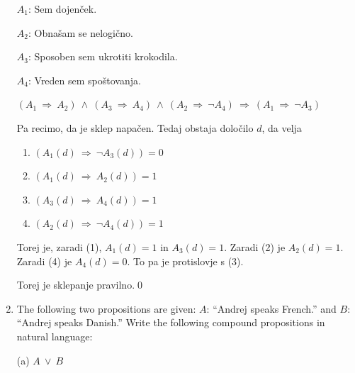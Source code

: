 \documentclass[11pt,paper=b5,footinclude,headinclude]{scrbook} %
\def\ali {{~\vee~}}
\def\inn {{~\wedge~}}
\def\sledi {{~\Rightarrow~}}
\begin{document}
\begin{enumerate}
$A_1$: Sem dojenček.

$A_2$: Obnašam se nelogično.

$A_3$: Sposoben sem ukrotiti krokodila.

$A_4$: Vreden sem spoštovanja.

$(A_1\sledi A_2)\inn (A_3\sledi A_4) \inn (A_2\sledi \neg A_4)\sledi (A_1\sledi \neg A_3)$

Pa recimo, da je sklep napačen. Tedaj obstaja določilo $d$, da velja
\begin{enumerate}[(1)]
  \item $(A_1(d)\sledi \neg A_3(d)) = 0$
  \item $(A_1(d)\sledi A_2(d)) = 1$
  \item $(A_3(d)\sledi A_4(d)) = 1$
  \item $(A_2(d)\sledi \neg A_4(d)) = 1$
\end{enumerate}
Torej je, zaradi (1), $A_1(d) = 1$ in $A_3(d) = 1$. Zaradi (2) je $A_2(d) = 1$.
Zaradi (4) je $A_4(d) = 0$. To pa je protislovje s (3).

Torej je sklepanje pravilno.\qed


%
%
%
%
%
%
%
%
%
%
%
%
%
%
%
%
%
%
%
%
%
%
%
%
%
%
%


\item
The following two propositions are given:
$A$: ``Andrej speaks French.'' and $B$: ``Andrej speaks Danish.''
Write the following compound propositions in natural language:

(a) $A\ali B$


\end{enumerate}
\end{document}
